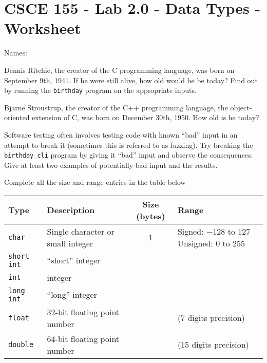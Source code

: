 \documentclass[12pt]{exam}
\begin{document}
\section*{CSCE 155 - Lab 2.0 - Data Types - Worksheet}

Names: \underline{\hspace{10cm}}

\begin{questions}

\question Dennis Ritchie, the creator of the C programming language,
was born on September 9th, 1941.  If he were still alive, how old
would he be today?  Find out by running the \texttt{birthday}
program on the appropriate inputs.

\begin{solution}[1cm]
\end{solution}

\question Bjarne Stroustrup, the creator of the C++ programming
language, the object-oriented extension of C, was born on December
30th, 1950.  How old is he today?

\begin{solution}[1cm]
\end{solution}

\question Software testing often involves testing code with known
``bad'' input in an attempt to break it (sometimes this is referred
to as fuzzing).  Try breaking the \texttt{birthday_cli}
program by giving it ``bad'' input and observe the consequences.
Give at least two examples of potentially bad input and the results.

\begin{solution}[1cm]
\end{solution}

\question Complete all the size and range entries in the table below
\begin{table}[h]
\centering
\begin{tabular}{|l|l|c|p{4cm}|}
\hline
Type & Description & Size (bytes) & Range \\
\hline\hline
\texttt{char} & Single character or small integer & 1 &
 Signed: $-128$ to $127$
 Unsigned: 0 to 255 \\
\hline
\texttt{short int} & ``short'' integer & ~ &  \vspace{1cm}\\
\hline
\texttt{int} & integer & ~ &  \vspace{1cm}\\
\hline
\texttt{long int} & ``long'' integer & ~ &  \vspace{1cm}\\
\hline
\texttt{float} & 32-bit floating point number & ~ & (7 digits precision)\\
\hline
\texttt{double} & 64-bit floating point number & ~ & (15 digits precision)\\
\hline
\end{tabular}
\end{table}


\end{questions}
\end{document}
